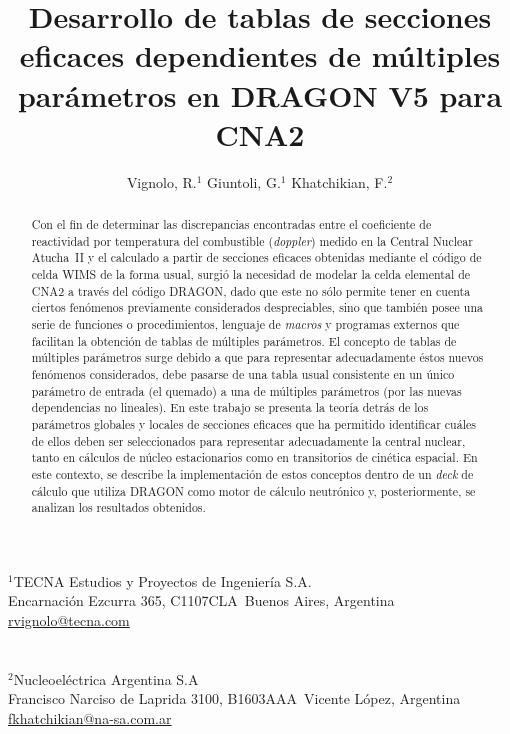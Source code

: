 \documentclass[11pt]{article}
\makeatletter
\def\affiliation#1{\def\@affiliation{#1}}
\def\maketitle{%
\thispagestyle{empty}

\newlength{\coff}
\setlength{\coff}{0.3cm}

\null
\vspace{0.5cm plus 0.5cm minus 0.5cm}

\begin{center}
\begin{minipage}{0.8\linewidth}
\begin{center}
\Large{\textbf{\textsc{\@title}}}

\vspace{0.75cm plus 0.2cm minus 0.1cm}

\large{\@author}

\vspace{1.25cm plus 0.25cm minus 0.25cm}

\small{\@affiliation}
\vspace{1cm plus 0.2cm minus 0.2cm}

\end{center}
\end{minipage}
\end{center}

}
\makeatother
\begin{document}
\title{Desarrollo de tablas de secciones eficaces dependientes de múltiples parámetros en DRAGON V5 para CNA2}
\author{Vignolo, R.$^{1}$ \quad Giuntoli, G.$^{1}$ \quad Khatchikian, F.$^{2}$}
\affiliation{%
$^1$TECNA Estudios y Proyectos de Ingeniería S.A.\\
Encarnaci\'on Ezcurra 365, C1107CLA~Buenos Aires, Argentina\\
\url{rvignolo@tecna.com}\\
~\\
~\\
$^2$Nucleoeléctrica Argentina S.A\\
Francisco Narciso de Laprida 3100, B1603AAA~Vicente López, Argentina\\
\url{fkhatchikian@na-sa.com.ar}\\
}


\maketitle


\begin{abstract}
\noindent
Con el fin de determinar las discrepancias encontradas entre el coeficiente de reactividad por temperatura del combustible (\emph{doppler}) medido en la Central Nuclear Atucha~II y el calculado a partir de secciones eficaces obtenidas mediante el código de celda WIMS de la forma usual, surgió la necesidad de modelar la celda elemental de CNA2 a través del código DRAGON, dado que este no sólo permite tener en cuenta ciertos fenómenos previamente considerados despreciables, sino que también posee una serie de funciones o procedimientos, lenguaje de \emph{macros} y programas externos que facilitan la obtención de tablas de múltiples parámetros. El concepto de tablas de múltiples parámetros surge debido a que para representar adecuadamente éstos nuevos fenómenos considerados, debe pasarse de una tabla usual consistente en un único parámetro de entrada (el quemado) a una de múltiples parámetros (por las nuevas dependencias no lineales). En este trabajo se presenta la teoría detrás de los parámetros globales y locales de secciones eficaces que ha permitido identificar cuáles de ellos deben ser seleccionados para representar adecuadamente la central nuclear, tanto en cálculos de núcleo estacionarios como en transitorios de cinética espacial. En este contexto, se describe la implementación de estos conceptos dentro de un \emph{deck} de cálculo que utiliza DRAGON como motor de cálculo neutrónico y, posteriormente, se analizan los resultados obtenidos.

\end{abstract}
\end{document}
